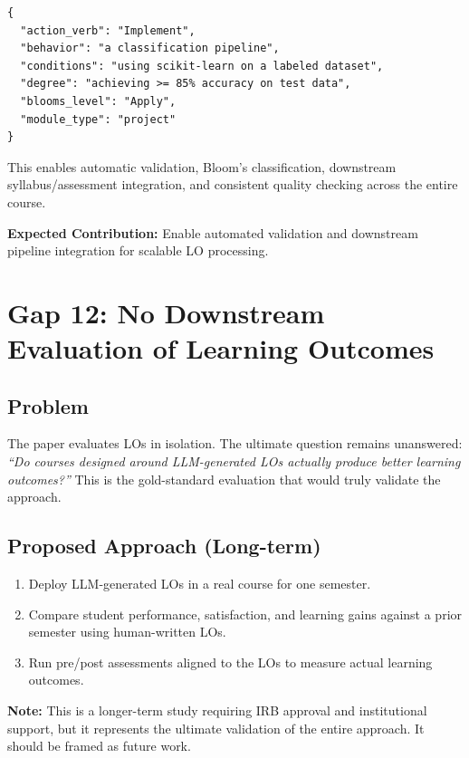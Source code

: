 \documentclass[11pt,a4paper]{article}
\begin{document}
\begin{verbatim}
{
  "action_verb": "Implement",
  "behavior": "a classification pipeline",
  "conditions": "using scikit-learn on a labeled dataset",
  "degree": "achieving >= 85% accuracy on test data",
  "blooms_level": "Apply",
  "module_type": "project"
}
\end{verbatim}

This enables automatic validation, Bloom's classification, downstream syllabus/assessment integration, and consistent quality checking across the entire course.

\begin{notebox}
\textbf{Expected Contribution:} Enable automated validation and downstream pipeline integration for scalable LO processing.
\end{notebox}

\section{Gap 12: No Downstream Evaluation of Learning Outcomes}

\subsection{Problem}
The paper evaluates LOs in isolation. The ultimate question remains unanswered: \textit{``Do courses designed around LLM-generated LOs actually produce better learning outcomes?''} This is the gold-standard evaluation that would truly validate the approach.

\subsection{Proposed Approach (Long-term)}
\begin{enumerate}[nosep]
    \item Deploy LLM-generated LOs in a real course for one semester.
    \item Compare student performance, satisfaction, and learning gains against a prior semester using human-written LOs.
    \item Run pre/post assessments aligned to the LOs to measure actual learning outcomes.
\end{enumerate}

\begin{warnbox}
\textbf{Note:} This is a longer-term study requiring IRB approval and institutional support, but it represents the ultimate validation of the entire approach. It should be framed as future work.
\end{warnbox}
\end{document}
